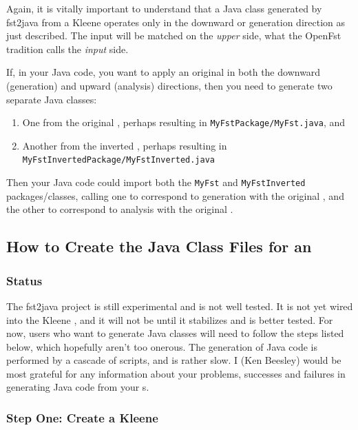 Again, it is vitally important to understand that a Java class generated by fst2java from a Kleene
\fsm{} operates only in the downward or
generation direction as just described.  The input will be matched on the \emph{upper} side, what
the OpenFst tradition calls the \emph{input} side. 

If, in your Java code, you want to apply an
original \fst{} in both the downward (generation) and upward (analysis) directions, then
you need to generate two separate Java classes:

\begin{enumerate}
\item
One from the original \fst{}, perhaps resulting in \texttt{MyFstPackage/MyFst.java}, and
\item
Another from the inverted \fst{}, perhaps resulting in
\texttt{MyFstInvertedPackage/MyFstInverted.java}
\end{enumerate}

\noindent
Then your Java code could import both the \texttt{MyFst} and \texttt{MyFstInverted} packages/classes, calling one to
correspond to generation with the original \fst{}, and the other to correspond to analysis
with the original \fst{}.

\subsection{How to Create the Java Class Files for an \fsm{}}

\subsubsection{Status}

The fst2java project is still experimental and is not well tested.  It is not yet wired
into the Kleene , and it will not be until it stabilizes and is better tested.  For now,
users who want to generate Java classes will need to follow the steps listed below, which hopefully
aren't too onerous.  The generation of Java code is performed by a cascade of \xslt{} scripts, and
is rather slow.  I (Ken Beesley) would be most grateful for any information about your problems,
successes and failures in generating Java code from your \fsm{}s.

\subsubsection{Step One: Create a Kleene \fsm{}}

